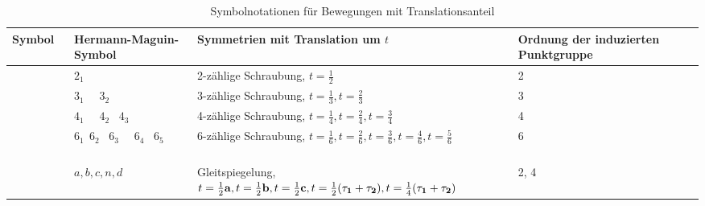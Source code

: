 \begin{table}[htp]
	\caption{Symbolnotationen für Bewegungen mit Translationsanteil}
	\begin{tabular}{C{1.5cm}C{3cm}C{5cm}C{3cm}c}
		\toprule
		Symbol                                                       & Hermann-Maguin-Symbol       & Symmetrien mit Translation um $t$                                                                                                                                                                       & Ordnung der induzierten Punktgruppe & \\
		\midrule
		                                                     & $2_1$                                      & 2-zählige Schraubung, $t=\frac{1}{2}$                                                                                                                                                                       & 2                      &  \\
		 \ \                                         & $3_1$ \ \  $3_2$                           & 3-zählige Schraubung, $t=\frac{1}{3}, t=\frac{2}{3}$                                                                                                                                                       & 3                       & \\
		\ \   \ \                            & $4_1$ \ \ $4_2$ \ \newline $4_3$                  & 4-zählige Schraubung, $t=\frac{1}{4}, t=\frac{2}{4}, t=\frac{3}{4}$                                                                                                                                        & 4                        & \\
		 \ \  \ \  \ \  \ \  & $6_1 \ \ 6_2$ \ \newline $6_3$ \ \ $6_4$ \ \newline $6_5$ & 6-zählige Schraubung, $t=\frac{1}{6}, t=\frac{2}{6}, t=\frac{3}{6},$\newline$ t=\frac{4}{6}, t=\frac{5}{6}$                                                                                                          & 6                       & \\
		                                                      & $a, b, c, n, d$                            &  Gleitspiegelung, $t=\frac{1}{2}\mathbf{a}, t=\frac{1}{2}\mathbf{b}, t=\frac{1}{2}\mathbf{c}, t=\frac{1}{2}(\mathbf{\tau_1}+\mathbf{\tau_2}), t=\frac{1}{4}(\mathbf{\tau_1} +\mathbf{\tau_2}) $ & 2, 4 & \\                  
		\bottomrule
	\end{tabular}
\end{table}

